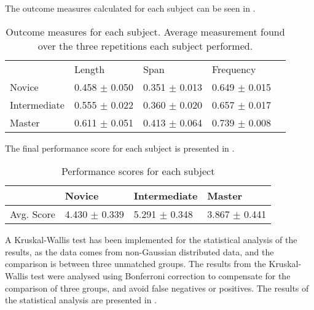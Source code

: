 

The outcome measures calculated for each subject can be seen in .
\begin{table}[h]
	\begin{tabular}{|l|l|l|l|l}
		\cline{1-4}
		                 & Length                      & Span                      & Frequency               &  \\ \cline{1-4}
		Novice       & 0.458 $\pm$ 0.050 & 0.351 $\pm$ 0.013 & 0.649 $\pm$ 0.015 &  \\ \cline{1-4}
		Intermediate & 0.555 $\pm$ 0.022 & 0.360 $\pm$ 0.020 & 0.657 $\pm$ 0.017 &  \\ \cline{1-4}
		Master       & 0.611 $\pm$ 0.051 & 0.413 $\pm$ 0.064 & 0.739 $\pm$ 0.008 &  \\ \cline{1-4}
	\end{tabular}
\caption{Outcome measures for each subject. Average measurement found over the three repetitions each subject performed.}
\label{tab:measures}
\end{table}


The final performance score for each subject is presented in .

\begin{table}[h]
	\begin{tabular}{|l|l|l|l|}
		\hline
				          & Novice                     & Intermediate           & Master                   \\  \hline
		Avg. Score & 4.430 $\pm$ 0.339 & 5.291 $\pm$ 0.348 & 3.867 $\pm$ 0.441 \\ \hline
	\end{tabular}
\caption{Performance scores for each subject}
\label{tab:scores}
\end{table}

A Kruskal-Wallis test has been implemented for the statistical analysis of the results, as the data comes from non-Gaussian distributed data, and the comparison is between three unmatched groups. The results from the Kruskal-Wallis test were analysed using Bonferroni correction to compensate for the comparison of three groups, and avoid false negatives or positives. The results of the statistical analysis are presented in .


